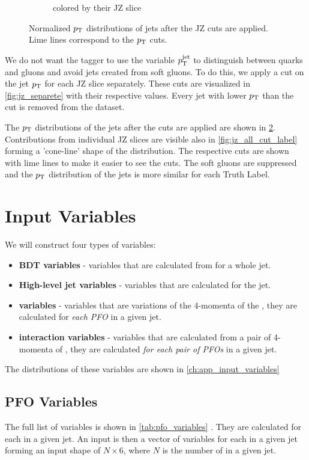 \begin{figure}[htb]
\begin{subfigure}[t]{0.49\textwidth}
        \caption{colored by their JZ slice}
        \label{fig:jz_all_cut_jz}
    \end{subfigure}
    \caption{Normalized $p_\text{T}$ distributions of jets after the JZ cuts are applied. Lime lines correspond to the $p_\text{T}$ cuts.}
    \label{fig:jz_all_cut}
\end{figure}
We do not want the tagger to use the variable $p_\text{T}^{\text{jet}}$ to distinguish between quarks and gluons and avoid jets created from soft gluons.
To do this, we apply a cut on the jet $p_\text{T}$ for each JZ slice separately.
These cuts are visualized in \cref{fig:jz_separete} with their respective values.
Every jet with lower $p_\text{T}$ than the cut is removed from the dataset.

The $p_\text{T}$ distributions of the jets after the cuts are applied are shown in \cref{fig:jz_all_cut}.
Contributions from individual JZ slices are visible also in \cref{fig:jz_all_cut_label} forming a 'cone-line' shape of the distribution.
The respective cuts are shown with lime lines to make it easier to see the cuts.
The soft gluons are suppressed and the $p_\text{T}$ distribution of the jets is more similar for each Truth Label. 


\FloatBarrier
\section{Input Variables}
\label{sec:input_variables}
We will construct four types of variables:
\begin{itemize}
    \item \textbf{BDT variables} - variables that are calculated from \PFOs for a whole jet.
    \item \textbf{High-level jet variables} - variables that are calculated for the jet.
    \item \textbf{\PFO variables} - variables that are variations of the 4-momenta of the \PFOs, they are calculated for \emph{each PFO} in a given jet.
    \item \textbf{\PFO interaction variables} - variables that are calculated from a pair of 4-momenta of \PFO, they are calculated \emph{for each pair of PFOs} in a given jet.
\end{itemize}
The distributions of these variables are shown in \cref{ch:app_input_variables}

\subsection{PFO Variables}
\label{sec:pfo_variables}

The full list of \PFO variables is shown in \cref{tab:pfo_variables} \cite{part}.
They are calculated for each \PFO in a given jet.
An input is then a vector of \PFO variables for each \PFO in a given jet forming an input shape of $N \times 6$, where $N$ is the number of \PFOs in a given jet.

